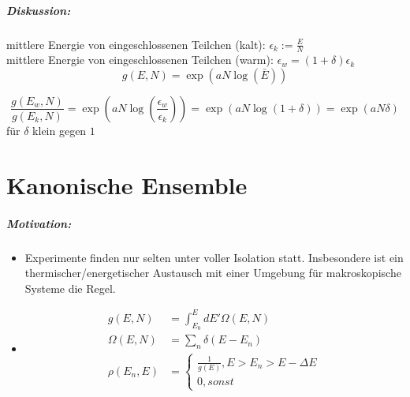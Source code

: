 \paragraph*{Diskussion:}
mittlere Energie von eingeschlossenen Teilchen (kalt):
$\epsilon _k := \frac EN$\\
mittlere Energie von eingeschlossenen Teilchen (warm):
$\epsilon _w = (1+\delta)\epsilon _k$
$$g(E, N) = \exp(aN\log(\bar E))$$

\begin{equation*}
    \frac{g(E_w, N)}{g(E_k, N)}=
    \exp(aN\log(\frac{\epsilon _w}{\epsilon _k}))=
    \exp(aN\log(1+\delta))=\exp(aN\delta)
\end{equation*}
für $\delta$ klein gegen $1$

\chapter{Kanonische Ensemble}
\paragraph*{Motivation:}
\begin{itemize}
    \item Experimente finden nur selten unter voller Isolation statt.
Insbesondere ist ein thermischer/energetischer Austausch mit einer Umgebung für makroskopische Systeme die Regel.
    \item \begin{align*}
            g(E, N) &= \int_{E_0}^{E}dE'\Omega(E, N)\\
            \Omega(E, N) &= \sum_n\delta(E-E_n)\\
            \rho(E_n, E) &= \begin{cases}\frac{1}{g(E)} , E>E_n>E-\Delta E\\0 , sonst\end{cases}
        \end{align*}
\end{itemize}

